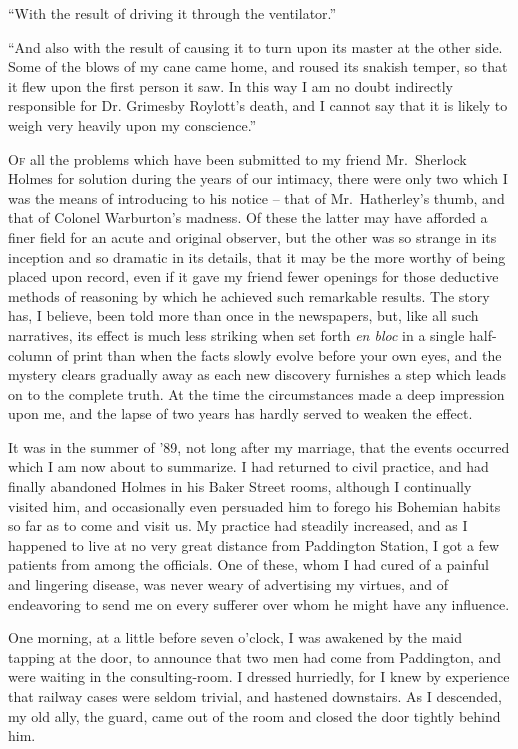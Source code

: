 “With the result of driving it through the ventilator.”

“And also with the result of causing it to turn upon its
master at the other side. Some of the blows of my cane
came home, and roused its snakish temper, so that it flew
upon the first person it saw. In this way I am no doubt indirectly
responsible for Dr. Grimesby Roylott’s death, and I
cannot say that it is likely to weigh very heavily upon my
conscience.”


\textsc{Of} all the problems which have been submitted to
my friend Mr.~Sherlock Holmes for solution during
the years of our intimacy, there were only
two which I was the means of introducing to his
notice -- that of Mr.~Hatherley’s thumb, and that of Colonel
Warburton’s madness. Of these the latter may have afforded
a finer field for an acute and original observer, but the other
was so strange in its inception and so dramatic in its details,
that it may be the more worthy of being placed upon record,
even if it gave my friend fewer openings for those deductive
methods of reasoning by which he achieved such remarkable
results. The story has, I believe, been told more than once
in the newspapers, but, like all such narratives, its effect is
much less striking when set forth \textit{en bloc} in a single half-%
column of print than when the facts slowly evolve before your
own eyes, and the mystery clears gradually away as each new
discovery furnishes a step which leads on to the complete
truth. At the time the circumstances made a deep impression
upon me, and the lapse of two years has hardly served
to weaken the effect.

It was in the summer of ’89, not long after my marriage,
that the events occurred which I am now about to summarize.
I had returned to civil practice, and had finally abandoned
Holmes in his Baker Street rooms, although I continually
visited him, and occasionally even persuaded him to forego
his Bohemian habits so far as to come and visit us. My practice
had steadily increased, and as I happened to live at no
very great distance from Paddington Station, I got a few
patients from among the officials. One of these, whom I
had cured of a painful and lingering disease, was never
weary of advertising my virtues, and of endeavoring to
send me on every sufferer over whom he might have any
influence.

One morning, at a little before seven o’clock, I was awakened
by the maid tapping at the door, to announce that two
men had come from Paddington, and were waiting in the
consulting-room. I dressed hurriedly, for I knew by experience
that railway cases were seldom trivial, and hastened downstairs.
As I descended, my old ally, the guard, came out of
the room and closed the door tightly behind him.

